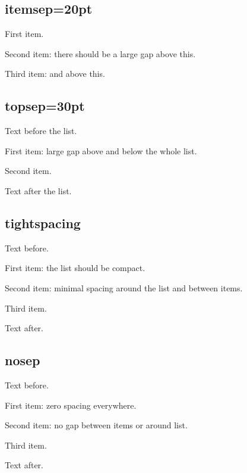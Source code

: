 \documentclass[leqno]{article}
\begin{document}
\subsection{itemsep=20pt}

\begin{prop}
    \item First item.
    \item Second item: there should be a large gap above this.
    \item Third item: and above this.
\end{prop}

\subsection{topsep=30pt}

Text before the list.
\begin{prop}
    \item First item: large gap above and below the whole list.
    \item Second item.
\end{prop}
Text after the list.

\subsection{tightspacing}

Text before.
\begin{prop}
    \item First item: the list should be compact.
    \item Second item: minimal spacing around the list and between items.
    \item Third item.
\end{prop}
Text after.

\subsection{nosep}

Text before.
\begin{prop}
    \item First item: zero spacing everywhere.
    \item Second item: no gap between items or around list.
    \item Third item.
\end{prop}
Text after.
\end{document}
